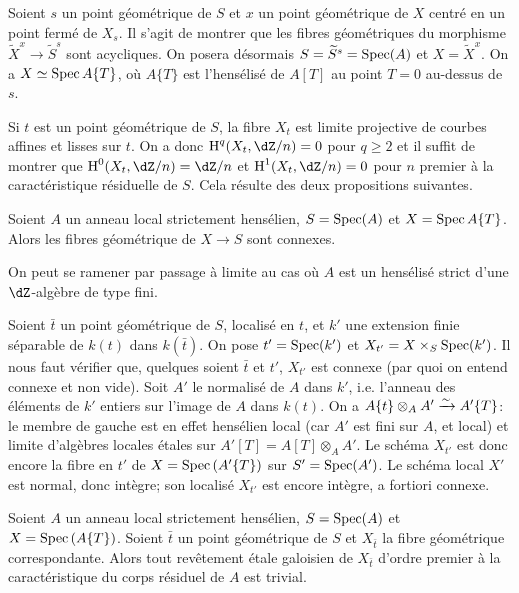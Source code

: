 Soient $s$ un point géométrique de $S$ et $x$ un point géométrique de 
$X$ centré en un point fermé de $X_s$. Il s'agit de montrer que les fibres 
géométriques du morphisme $\widetilde X^x\to \widetilde S^s$ sont 
acycliques. On posera désormais $S=\widetilde S^s=\operatorname{Spec}(A)$ et 
$X=\widetilde X^x$. On a $X\simeq \operatorname{Spec} A\{T\}$, où $A\{T\}$ est l'hensélisé 
de $A[T]$ au point $T=0$ au-dessus de $s$. 

Si $t$ est un point géométrique de $S$, la fibre $X_t$ est limite 
projective de courbes affines et lisses sur $t$. On a donc $\h^q(X_t,\dZ/n) = 0$ 
pour $q\geqslant 2$ et il suffit de montrer que $\h^0(X_t,\dZ/n) = \dZ/n$ et 
$\h^1(X_t,\dZ/n) = 0$ pour $n$ premier à la caractéristique résiduelle de 
$S$. Cela résulte des deux propositions suivantes. 





\begin{proposition}\label{I:5-2-2}
Soient $A$ un anneau local strictement hensélien, $S=\operatorname{Spec}(A)$ et 
$X=\operatorname{Spec} A\{T\}$. Alors les fibres géométrique de $X\to S$ sont connexes. 
\end{proposition}

On peut se ramener par passage à limite au cas où $A$ est un hensélisé 
strict d'une $\dZ$-algèbre de type fini. 

Soient $\bar t$ un point géométrique de $S$, localisé en $t$, et $k'$ une 
extension finie séparable de $k(t)$ dans $k(\bar t)$. On pose $t'=\operatorname{Spec}(k')$ 
et $X_{t'} = X\times_S\operatorname{Spec}(k')$. Il nous faut vérifier que, quelques soient 
$\bar t$ et $t'$, $X_{t'}$ est connexe (par quoi on entend connexe et non vide). 
Soit $A'$ le normalisé de $A$ dans $k'$, i.e. l'anneau des éléments de 
$k'$ entiers sur l'image de $A$ dans $k(t)$. On a 
$A\{t\}\otimes_A A'\xrightarrow\sim A'\{T\}$: le membre de gauche est en effet hensélien 
local (car $A'$ est fini sur $A$, et local) et limite d'algèbres locales 
étales sur $A'[T]=A[T]\otimes_A A'$. Le schéma $X_{t'}$ est donc encore 
la fibre en $t'$ de $X=\operatorname{Spec}\left(A'\{T\}\right)$ sur $S'=\operatorname{Spec}(A')$. Le 
schéma local $X'$ est normal, donc intègre; son localisé $X_{t'}$ est 
encore intègre, a fortiori connexe. 





\begin{proposition}\label{I:5-2-3}
Soient $A$ un anneau local strictement hensélien, $S=\operatorname{Spec}(A)$ et 
$X=\operatorname{Spec}\left(A\{T\}\right)$. Soient $\bar t$ un point géométrique de $S$ 
et $X_{\bar t}$ la fibre géométrique correspondante. Alors tout revêtement 
étale galoisien de $X_{\bar t}$ d'ordre premier à la caractéristique du 
corps résiduel de $A$ est trivial. 
\end{proposition}





